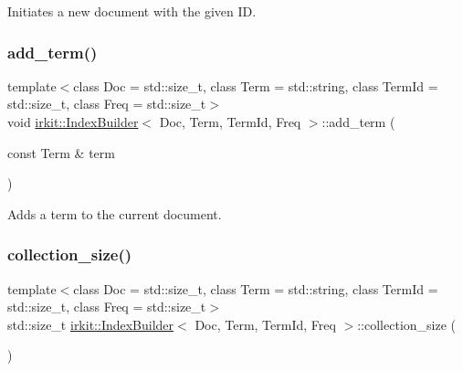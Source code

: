 Initiates a new document with the given ID. 

\mbox{\label{classirkit_1_1IndexBuilder_a6005b21c9a24cb54fe54957e21c0487a}} 
\subsubsection{\texorpdfstring{add\+\_\+term()}{add\_term()}}
{\footnotesize\ttfamily template$<$class Doc  = std\+::size\+\_\+t, class Term  = std\+::string, class Term\+Id  = std\+::size\+\_\+t, class Freq  = std\+::size\+\_\+t$>$ \\
void \mbox{\hyperlink{classirkit_1_1IndexBuilder}{irkit\+::\+Index\+Builder}}$<$ Doc, Term, Term\+Id, Freq $>$\+::add\+\_\+term (\begin{DoxyParamCaption}\item[{const Term \&}]{term }\end{DoxyParamCaption})\hspace{0.3cm}{\ttfamily [inline]}}



Adds a term to the current document. 

\mbox{\label{classirkit_1_1IndexBuilder_a81221fd5879c7d68d4d6bff6005b8cd7}} 
\subsubsection{\texorpdfstring{collection\+\_\+size()}{collection\_size()}}
{\footnotesize\ttfamily template$<$class Doc  = std\+::size\+\_\+t, class Term  = std\+::string, class Term\+Id  = std\+::size\+\_\+t, class Freq  = std\+::size\+\_\+t$>$ \\
std\+::size\+\_\+t \mbox{\hyperlink{classirkit_1_1IndexBuilder}{irkit\+::\+Index\+Builder}}$<$ Doc, Term, Term\+Id, Freq $>$\+::collection\+\_\+size (\begin{DoxyParamCaption}{ }\end{DoxyParamCaption})\hspace{0.3cm}{\ttfamily [inline]}}




